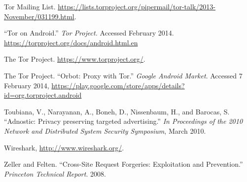 \documentclass[conference]{IEEEtran}
\begin{document}
\begin{thebibliography}{1}
 Tor Mailing List.  \url{https://lists.torproject.org/pipermail/tor-talk/2013-November/031199.html}.

 ``Tor on Android.'' \emph{Tor Project.} Accessed February 2014. \url{https://torproject.org/docs/android.html.en}

 The Tor Project.  \url{https://www.torproject.org/}.

 The Tor Project. ``Orbot: Proxy with Tor.'' \emph{Google Android Market}. Accessed 7 February 2014, \url{https://play.google.com/store/apps/details?id=org.torproject.android}

 Toubiana, V., Narayanan, A., Boneh, D., Nissenbaum, H., and Barocas, S. ``Adnostic: Privacy preserving targeted advertising.'' \emph{In Proceedings of the 2010 Network and Distributed System Security Symposium}, March 2010.

 Wireshark, \url{http://www.wireshark.org/}. 

 Zeller and Felten. ``Cross-Site Request Forgeries: Exploitation and Prevention.'' \emph{Princeton Technical Report}. 2008.


\end{thebibliography}




\end{document}
